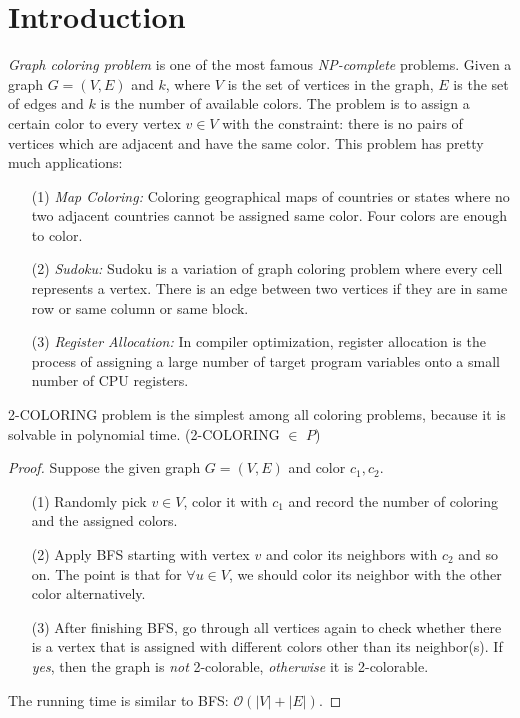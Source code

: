 \section{Introduction}
\textit{Graph coloring problem} is one of the most famous \textit{NP-complete} problems. Given a graph $G = (V, E)$ and $k$, where $V$ is the set of vertices in the graph, $E$ is the set of edges and $k$ is the number of available colors. The problem is to assign a certain color to every vertex $v \in V$ with the constraint: there is no pairs of vertices which are adjacent and  have the same color.
This problem has pretty much applications:
\begin{itemize}
    \item[(1)] \textit{Map Coloring:} Coloring geographical maps of countries or states where no two adjacent countries cannot be assigned same color. Four colors are enough to color.
    \item[(2)] \textit{Sudoku:} Sudoku is a variation of graph coloring problem where every cell represents a vertex. There is an edge between two vertices if they are in same row or same column or same block.
    \item[(3)] \textit{Register Allocation:} In compiler optimization, register allocation is the process of assigning a large number of target program variables onto a small number of CPU registers. \cite{example}
\end{itemize}

\begin{claim}
2-COLORING problem is the simplest among all coloring problems, because it is solvable in polynomial time. (2-COLORING $\in$ $P$)
\end{claim}

\begin{proof}
Suppose the given graph $G = (V, E)$ and color $c_1, c_2$. 
\begin{itemize}
    \item[(1)] Randomly pick $v \in V$, color it with $c_1$ and record the number of coloring and the assigned colors.
    \item[(2)] Apply BFS starting with vertex $v$ and color its neighbors with $c_2$ and so on. The point is that for $\forall u \in V$, we should color its neighbor with the other color alternatively.
    \item[(3)] After finishing BFS, go through all vertices again to check whether there is a vertex that is assigned with different colors other than its neighbor(s). If \textit{yes}, then the graph is \textit{not} 2-colorable, \textit{otherwise} it is 2-colorable.
\end{itemize}
The running time is similar to BFS: $\mathcal{O}(|V| + |E|)$.
\end{proof}

